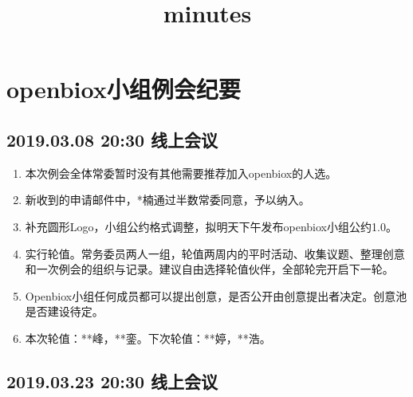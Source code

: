 \documentclass[]{article}
\title{minutes}
\author{}
\date{}
\providecommand{\tightlist}{%
  \setlength{\itemsep}{0pt}\setlength{\parskip}{0pt}}
\begin{document}
\maketitle

\hypertarget{openbiox}{%
\section{openbiox小组例会纪要}\label{openbiox}}

\hypertarget{section}{%
\subsection{2019.03.08 20:30 线上会议}\label{section}}

\begin{enumerate}
\def\labelenumi{\arabic{enumi}.}
\tightlist
\item
  本次例会全体常委暂时没有其他需要推荐加入openbiox的人选。
\item
  新收到的申请邮件中，*楠通过半数常委同意，予以纳入。
\item
  补充圆形Logo，小组公约格式调整，拟明天下午发布openbiox小组公约1.0。
\item
  实行轮值。常务委员两人一组，轮值两周内的平时活动、收集议题、整理创意和一次例会的组织与记录。建议自由选择轮值伙伴，全部轮完开启下一轮。
\item
  Openbiox小组任何成员都可以提出创意，是否公开由创意提出者决定。创意池是否建设待定。
\item
  本次轮值：**峰，**銮。下次轮值：**婷，**浩。
\end{enumerate}

\hypertarget{section-1}{%
\subsection{2019.03.23 20:30 线上会议}\label{section-1}}
\end{document}
